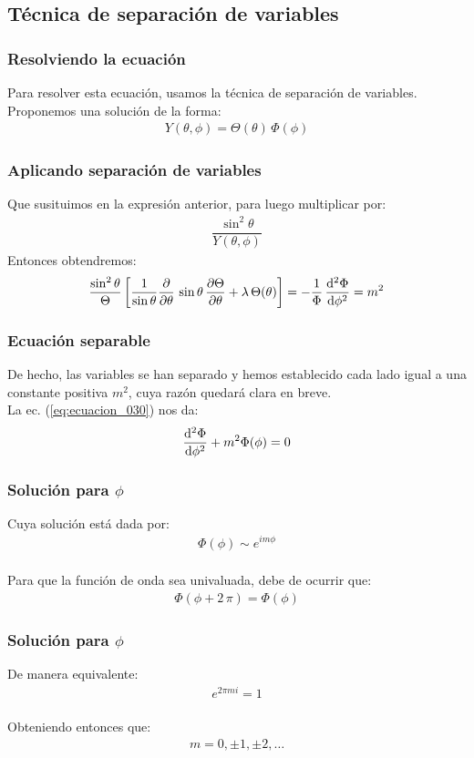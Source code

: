 \documentclass[12pt]{beamer}
\begin{document}
\subsection{Técnica de separación de variables}

\begin{frame}
\frametitle{Resolviendo la ecuación}
Para resolver esta ecuación, usamos la técnica de separación de variables. Proponemos una solución de la forma:
\begin{align}
Y(\theta, \phi) = \Theta(\theta) \, \Phi(\phi)
\label{eq:ecuacion_029}
\end{align}
\end{frame}
\begin{frame}
\frametitle{Aplicando separación de variables}
Que susituimos en la expresión anterior, para luego multiplicar por:
\begin{align*}
\dfrac{\sin^{2} \theta}{Y(\theta, \phi)}
\end{align*}
\pause
Entonces obtendremos:
\begin{align}
\dfrac{\sin^{2} \theta}{\Theta} \left[ \dfrac{1}{\sin \theta} \pdv{\theta} \, \sin \theta \, \pdv{\Theta}{\theta} + \lambda \, \Theta (\theta) \right] = -  \dfrac{1}{\Phi} \, \dv[2]{\Phi}{\phi} = m^{2}
\label{eq:ecuacion_030}
\end{align}
\end{frame}
\begin{frame}
\frametitle{Ecuación separable}
De hecho, las variables se han separado y hemos establecido cada lado igual a una constante positiva $m^{2}$, cuya razón quedará clara en breve.
\\
\bigskip
\pause
La ec. (\ref{eq:ecuacion_030}) nos da:
\begin{align*}
    \dv[2]{\Phi}{\phi} + m^{2} \Phi (\phi) = 0
\end{align*}
\end{frame}
\begin{frame}
\frametitle{Solución para $\phi$}
Cuya solución está dada por:
\begin{align*}
    \Phi(\phi) \sim e^{i m \phi}
\end{align*}
\\
\bigskip
Para que la función de onda sea univaluada, debe de ocurrir que:
\begin{align}
    \Phi(\phi +  2 \, \pi) = \Phi(\phi)
    \label{eq:ecuacion_031}
\end{align}
\end{frame}
\begin{frame}
\frametitle{Solución para $\phi$}
De manera equivalente:
\begin{align*}
    e^{2 \pi m i} = 1
\end{align*}
\\
\bigskip
\pause
Obteniendo entonces que:
\begin{align*}
    m = 0, \pm 1, \pm 2, \ldots
\end{align*}
\end{frame}
\end{document}
